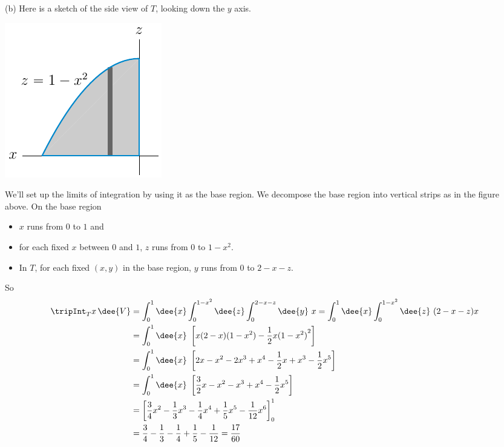 \begin{solution}
(b) Here is a sketch of the side view of $T$, looking down the $y$ axis. 
\begin{center}
     \includegraphics{fig/OE01AQ8a.pdf}
\end{center}
We'll set up the limits of integration by using it as the base region.
We decompose the base region into vertical strips as in the figure above.
On the base region
\begin{itemize}
\item
$x$ runs from $0$ to $1$ and
\item 
for each fixed $x$ between $0$ and $1$, $z$ runs from $0$ to $1-x^2$.
\item
In $T$, for each fixed $(x,y)$ in the base region, $y$ runs from $0$ to
$2-x-z$.
\end{itemize}
So
\begin{align*}
\tripInt_T x\,\dee{V}
&=\int_0^1\dee{x}\int_0^{1-x^2}\dee{z}\int_0^{2-x-z}\dee{y}\ x
=\int_0^1\dee{x}\int_0^{1-x^2}\dee{z}\ (2-x-z)x\cr
&=\int_0^1 \dee{x}\ \left[x(2-x)(1-x^2)-\frac{1}{2} x{(1-x^2)}^2\right] \\
&=\int_0^1 \dee{x}\ \left[2x-x^2-2x^3+x^4-\frac{1}{2} x+x^3
             -\frac{1}{2} x^5\right] \\
&=\int_0^1 \dee{x}\ \left[\frac{3}{2}x-x^2-x^3+x^4-\frac{1}{2} x^5\right] \\
&=\left[\frac{3}{4}x^2-\frac{1}{3}x^3-\frac{1}{4}x^4+\frac{1}{5}x^5 -\frac{1}{12}x^6\right]_0^1 \\
&=\frac{3}{4}-\frac{1}{3}-\frac{1}{4}+\frac{1}{5}-\frac{1}{12}
=\frac{17}{60}
\end{align*}
\end{solution}



